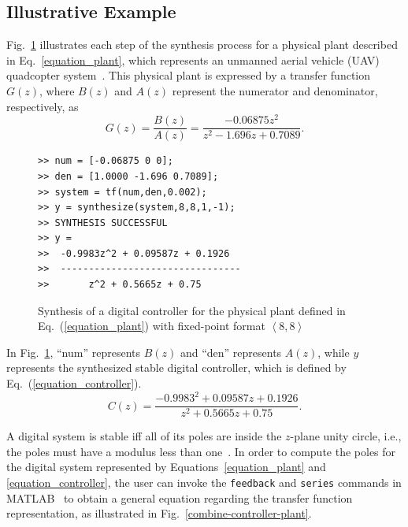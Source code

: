\documentclass[conference]{IEEEtran}
\begin{document}
\subsection{Illustrative Example}

Fig.~\ref{toolbox-usage} illustrates each
step of the synthesis process for a physical plant described in
Eq.~\eqref{equation_plant}, which represents an unmanned aerial vehicle
(UAV) quadcopter system~\cite{bouabdallah}.  This physical plant is
expressed by a transfer function $G(z)$, where $B(z)$ and $A(z)$ represent
the numerator and denominator, respectively, as
%
\begin{equation}
\label{equation_plant}
G(z)=\frac{B(z)}{A(z)}=\frac{-0.06875z^{2}}{z^2-1.696z+0.7089}.
\end{equation}

\begin{figure}[ht]
\scriptsize
\begin{lstlisting}[xleftmargin=.025\textwidth,xrightmargin=.025\textwidth, frame=single,basicstyle=\tt]
>> num = [-0.06875 0 0];
>> den = [1.0000 -1.696 0.7089];
>> system = tf(num,den,0.002);
>> y = synthesize(system,8,8,1,-1);
>> SYNTHESIS SUCCESSFUL
>> y = 
>>  -0.9983z^2 + 0.09587z + 0.1926
>>  --------------------------------
>>       z^2 + 0.5665z + 0.75
\end{lstlisting}
\caption{Synthesis of a digital controller for the physical plant
defined in Eq.~(\ref{equation_plant}) with 
fixed-point format $\left\langle 8,8\right\rangle$}
\label{toolbox-usage}
\end{figure}

In Fig.~\ref{toolbox-usage}, ``num'' represents $B(z)$ and ``den'' represents
$A(z)$, while $y$ represents the synthesized stable digital controller,
which is defined by Eq.~(\ref{equation_controller}).
%
\begin{equation}
\label{equation_controller}
C(z)=\frac{-0.9983^{2}+0.09587z+0.1926}{z^2+0.5665z+0.75}.
\end{equation}

A digital system is stable iff all of its poles are inside the
$z$-plane unity circle, i.e., the poles must have a modulus less than
one~\cite{astrom1997computer}.  In order to compute the poles for the
digital system represented by Equations~\eqref{equation_plant} and
\eqref{equation_controller}, the user can invoke the \texttt{feedback} and
\texttt{series} commands in MATLAB~\cite{matlab-toolbox} to obtain a
general equation regarding the transfer function representation, as
illustrated in Fig.~\ref{combine-controller-plant}.
\end{document}
